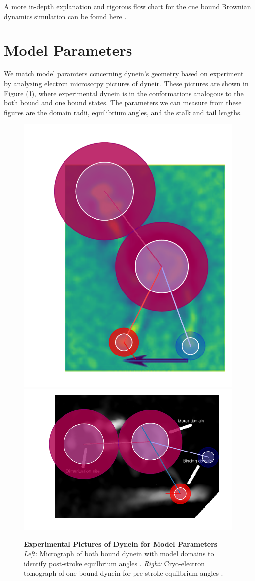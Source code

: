 A more in-depth explanation and rigorous flow chart for the one bound Brownian dynamics simulation can be found here \cite{Capek2017, }.


\section{Model Parameters}

We match model paramters concerning dynein's geometry based on experiment by analyzing electron microscopy pictures of dynein. These pictures are shown in Figure (\ref{fig:ParamsPics}), where experimental dynein is in the conformations analogous to the both bound and one bound states. The parameters we can measure from these figures are the domain radii, equilibrium angles, and the stalk and tail lengths.  

\begin{figure}[hbt!]
	\centering
	\includegraphics[width=0.3\columnwidth]{../../plots/burgess-model-figure.pdf}
	\includegraphics[width=0.5\columnwidth]{../../plots/grotjahn-model-figure.pdf}%
	\caption[Experimental Pictures of Dynein for Model Parameters]{\textbf{Experimental Pictures of Dynein for Model Parameters} \textit{Left:} Micrograph of both bound dynein with model domains to identify post-stroke equilbrium angles \cite{burgess2003dynein}.  \textit{Right:} Cryo-electron tomograph of one bound dynein for pre-stroke equilbrium angles \cite{grotjahn}.} 
	\label{fig:ParamsPics}
\end{figure}

